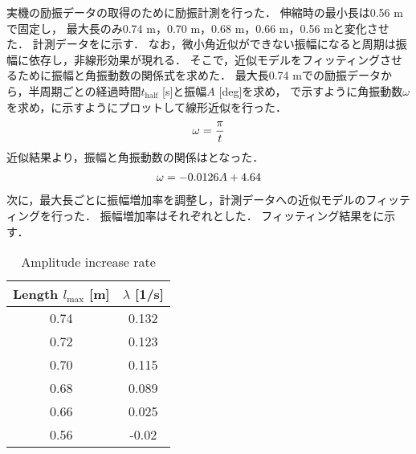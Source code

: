           実機の励振データの取得のために励振計測を行った．
          伸縮時の最小長は0.56 mで固定し，
          最大長のみ0.74 m，0.70 m，0.68 m，0.66 m，0.56 mと変化させた． 計測データを\figref{}に示す．    
          なお，微小角近似ができない振幅になると周期は振幅に依存し，非線形効果が現れる．
          そこで，近似モデルをフィッティングさせるために振幅と角振動数の関係式を求めた．
          最大長0.74 mでの励振データから，半周期ごとの経過時間$t_{\mathrm{half}}$ [s]と振幅$A$ [deg]を求め，
          で示すように角振動数$\omega$を求め，\figref{}に示すようにプロットして線形近似を行った．
          \begin{eqnarray}
            \equlabel{T2omega}
            \omega=\frac{\pi}{t}
          \end{eqnarray}
          近似結果より，振幅と角振動数の関係はとなった．
          \begin{eqnarray}
            \equlabel{A2ome}
            \omega=-0.0126A+4.64
          \end{eqnarray}
          次に，最大長ごとに振幅増加率を調整し，計測データへの近似モデルのフィッティングを行った．
          振幅増加率はそれぞれとした．
          フィッティング結果を\figref{}に示す．
          \begin{table}[tb]
            \begin{center}
              \caption{Amplitude increase rate}
              \vspace{2mm}
              \begin{tabular}{c|c}
                \hline
                Length $l_{\mathrm{max}}$ [m] & $\lambda$ [1/s] \\
                \hline
                0.74 &  0.132\\
                0.72 &  0.123\\
                0.70 &  0.115\\
                0.68 &  0.089\\
                0.66 &  0.025\\
                0.56 &  -0.02\\                       
                \hline
              \end{tabular}
            \end{center}
          \end{table}
